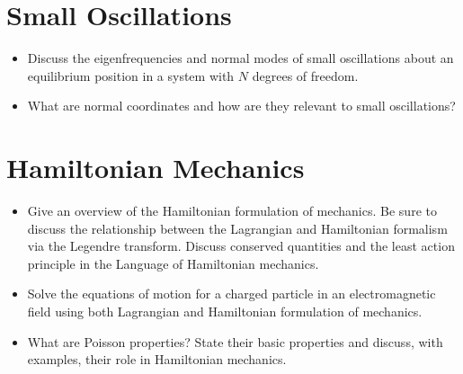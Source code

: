 \section{Small Oscillations}

\begin{itemize}

    \item Discuss the eigenfrequencies and normal modes of small oscillations about an equilibrium position in a system with $N$ degrees of freedom.

    \item What are normal coordinates and how are they relevant to small oscillations?

\end{itemize}

\section{Hamiltonian Mechanics}

\begin{itemize}

    \item Give an overview of the Hamiltonian formulation of mechanics. Be sure to discuss the relationship between the Lagrangian and Hamiltonian formalism via the Legendre transform. Discuss conserved quantities and the least action principle in the Language of Hamiltonian mechanics.

    \item Solve the equations of motion for a charged particle in an electromagnetic field using both Lagrangian and Hamiltonian formulation of mechanics.

    \item What are Poisson properties? State their basic properties and discuss, with examples, their role in Hamiltonian mechanics.

\end{itemize}







